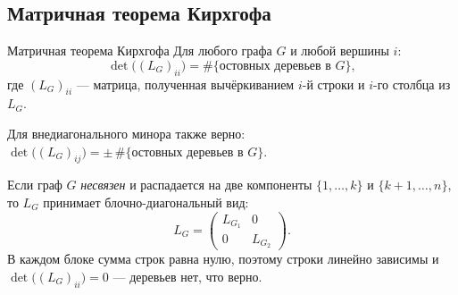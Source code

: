 \subsection{Матричная теорема Кирхгофа}

\begin{Theorem}{Матричная теорема Кирхгофа}{}
	Для любого графа $G$ и любой вершины $i$:
	\[
	\det\!\bigl((L_G)_{ii}\bigr) = \#\{\text{остовных деревьев в } G\},
	\]
	где $(L_G)_{ii}$ — матрица, полученная вычёркиванием $i$-й строки и $i$-го столбца из $L_G$.
\end{Theorem}

\begin{Remark}{}{}
	Для внедиагонального минора также верно:
	$\det\!\bigl((L_G)_{ij}\bigr) = \pm\,\#\{\text{остовных деревьев в } G\}$.
\end{Remark}

\begin{Remark}{}{}
	Если граф $G$ \emph{несвязен} и распадается на две компоненты
	$\{1,\ldots,k\}$ и $\{k{+}1,\ldots,n\}$, то $L_G$ принимает блочно-диагональный вид:
	\[
	L_G =
	\begin{pmatrix}
		L_{G_1} & 0 \\
		0       & L_{G_2}
	\end{pmatrix}.
	\]
	В каждом блоке сумма строк равна нулю, поэтому строки линейно зависимы и
	$\det\!\bigl((L_G)_{ii}\bigr) = 0$ — деревьев нет, что верно.
\end{Remark}

